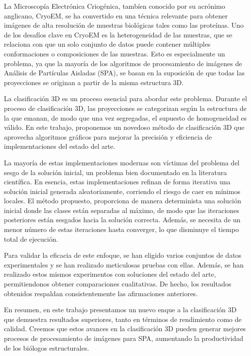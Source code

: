 \documentclass[../main.tex]{subfiles}
\begin{document}
La Microscopía Electrónica Criogénica, tambíen conocido por su acrónimo anglicano, CryoEM, se ha convertido en una técnica relevante para obtener imágenes de alta resolución de muestras biológicas tales como las proteínas. Uno de los desafíos clave en CryoEM es la heterogeneidad de las muestras, que se relaciona con que un solo conjunto de datos puede contener múltiples conformaciones o composiciones de las muestras. Esto es especialmente un problema, ya que la mayoría de los algoritmos de procesamiento de imágenes de Análisis de Partículas Aisladas (SPA), se basan en la suposición de que todas las proyecciones se originan a partir de la misma estructura 3D.

La clasificación 3D es un proceso esencial para abordar este problema. Durante el proceso de clasificación 3D, las proyecciones se categorizan según la estructura de la que emanan, de modo que una vez segregadas, el supuesto de homogeneidad es válido. En este trabajo, proponemos un novedoso método de clasificación 3D que aprovecha algoritmos gráficos para mejorar la precisión y eficiencia de implementaciones del estado del arte.

La mayoría de estas implementaciones modernas son víctimas del problema del sesgo de la solución inicial, un problema bien documentado en la literatura científica. En esencia, estas implementaciones refinan de forma iterativa una solución inicial generada aleatoriamente, corriendo el riesgo de caer en mínimos locales. El método propuesto, proporciona de manera determinista una solución inicial donde las clases están separadas al máximo, de modo que las iteraciones posteriores están sesgados hacia la solución correcta. Además, se necesita de un menor número de estas iteraciones hasta converger, lo que disminuye el tiempo total de ejecución.

Para validar la eficacia de este enfoque, se han eligido varios conjuntos de datos experimentales y se han realizado meticulosas pruebas con ellas. Además, se han realizado estos mismos experimentos con soluciones del estado del arte, permitiendonos obtener comparaciones cualitativas. De hecho, los resultados obtenidos respaldan consistentemente las afirmaciones anteriores.

En resumen, en este trabajo presentamos un nuevo enque a la clasificación 3D que demuestra resultados superiores, tanto en términos de rendimiento como de calidad. Creemos que estos avances en la clasificación 3D pueden generar mejores procesos de procesamiento de imágenes para SPA, aumentando la productividad de los biólogos estructurales.
\end{document}
